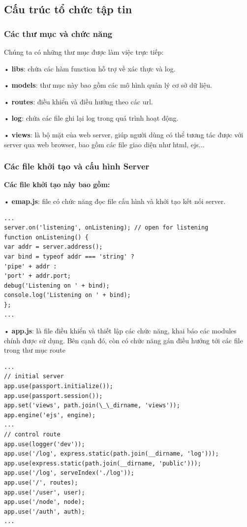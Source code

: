 \subsection{Cấu trúc tổ chức tập tin}
\subsubsection*{Các thư mục và chức năng}
Chúng ta có những thư mục được làm việc trực tiếp:

• \textbf{libs}: chứa các hàm function hỗ trợ về xác thực và log.

• \textbf{models}: thư mục này bao gồm các mô hình quản lý cơ sở dữ liệu.

• \textbf{routes}: điều khiển và điều hướng theo các url.

• \textbf{log}: chứa các file ghi lại log trong quá trình hoạt động.

• \textbf{views}: là bộ mặt của web server, giúp người dùng có thể tương tác được với server qua web browser, bao gồm các file giao diện như html, ejs...   


\subsubsection*{Các file khởi tạo và cấu hình Server}

\textbf{Các file khởi tạo này bao gồm:}

• \textbf{emap.js}: file có chức năng đọc file cấu hình và khởi tạo kết nối server.
\begin{lstlisting}[caption=emap.js]
...
server.on('listening', onListening); // open for listening
function onListening() {
var addr = server.address();
var bind = typeof addr === 'string' ?
'pipe' + addr :
'port' + addr.port;
debug('Listening on ' + bind);
console.log('Listening on ' + bind);
};
...
\end{lstlisting}

• \textbf{app.js}: là file điều khiển và thiết lập các chức năng, khai báo các modules chính được sử dụng. Bên cạnh đó, còn có chức năng gán điều hướng tới các file trong thư mục route
\begin{lstlisting}[caption=app.js]
...
// initial server
app.use(passport.initialize());
app.use(passport.session());
app.set('views', path.join(\_\_dirname, 'views'));
app.engine('ejs', engine);
...
// control route
app.use(logger('dev'));
app.use('/log', express.static(path.join(__dirname, 'log')));
app.use(express.static(path.join(__dirname, 'public')));
app.use('/log', serveIndex('./log'));
app.use('/', routes);
app.use('/user', user);
app.use('/node', node);
app.use('/auth', auth);
...
\end{lstlisting}

